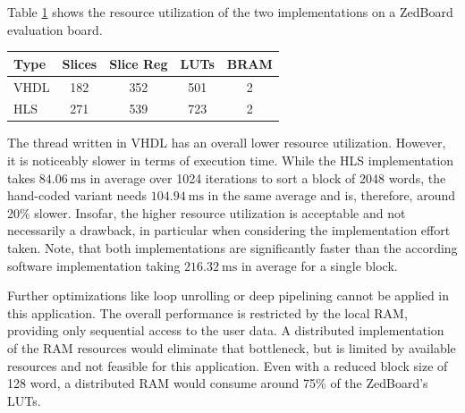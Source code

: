 Table \ref{tab:hls_util} shows the resource utilization of the two
implementations on a ZedBoard evaluation board.
\begin{table}
	\scriptsize
	\centering
	\label{tab:hls_util}
	\begin{tabular}{lcccc}
	\hline
	\textbf{Type} & \textbf{Slices} & \textbf{Slice Reg} & \textbf{LUTs} & \textbf{BRAM}\\
	\hline
	\ac{VHDL} & 182 & 352 & 501 & 2\\
	\ac{HLS} & 271 & 539 & 723 & 2\\
	\hline
	\end{tabular}
\end{table}
The thread written in \ac{VHDL} has an overall lower resource utilization.
However, it is noticeably slower in terms of execution time. While the
\ac{HLS} implementation takes $\SI{84.06}{\milli\second}$ in average over 1024
iterations to sort a block of 2048 words, the hand-coded variant needs
$\SI{104.94}{\milli\second}$ in the same average and is, therefore, around
20\% slower. Insofar, the higher resource utilization is acceptable and not
necessarily a drawback, in particular when considering the implementation
effort taken. Note, that both implementations are significantly faster than
the according software implementation taking $\SI{216.32}{\milli\second}$ in
average for a single block.

Further optimizations like loop unrolling or deep pipelining cannot be applied
in this application. The overall performance is restricted by the local
\ac{RAM}, providing only sequential access to the user data. A distributed
implementation of the \ac{RAM} resources would eliminate that bottleneck, but
is limited by available resources and not feasible for this application. Even
with a reduced block size of 128 word, a distributed \ac{RAM} would consume
around 75\% of the ZedBoard's \acp{LUT}.